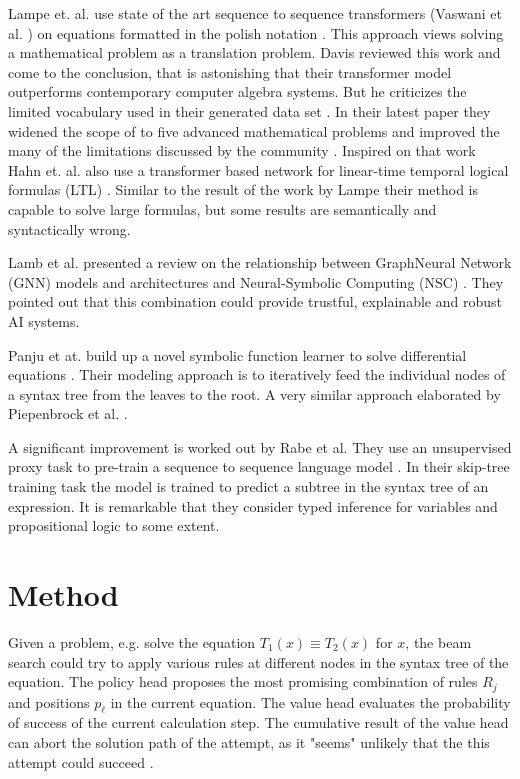 \documentclass{scrartcl}
\theoremstyle{definition}
\begin{document}
Lampe et. al. use state of the art sequence to sequence transformers (Vaswani et al. \cite{vaswani2017attention}) on equations formatted in the polish notation  \cite{Lample2020Deep}.
This approach views solving a mathematical problem as a translation problem.
Davis reviewed this work and come to the conclusion, that is astonishing that their transformer model outperforms contemporary computer algebra systems.
But he criticizes the limited vocabulary used in their generated data set \cite{davis2019use}.
In their latest paper they widened the scope of to five advanced mathematical problems and improved the many of the limitations discussed by the community \cite{charton2021learning}.
Inspired on that work Hahn et. al. also use a transformer based network for linear-time temporal logical formulas (LTL) \cite{hahn2021teaching}.
Similar to the result of the work by Lampe their method is capable to solve large formulas, but some results are semantically and syntactically wrong.

Lamb et al. presented a review on the relationship between GraphNeural Network (GNN) models and architectures and Neural-Symbolic Computing (NSC) \cite{lamb2020graph}.
They pointed out that this combination could provide trustful, explainable and robust AI systems.

Panju et at. build up a novel symbolic function learner to solve differential equations \cite{panju2020neurosymbolic}.
Their modeling approach is to iteratively feed the individual nodes of a syntax tree from the leaves to the root.
A very similar approach elaborated by Piepenbrock et al. \cite{piepenbrock2021learning}. 

A significant improvement is worked out by Rabe et al. They use an unsupervised proxy task to pre-train a sequence to sequence language model \cite{rabe2020mathematical}.
In their skip-tree training task the model is trained to predict a subtree in the syntax tree of an expression.
It is remarkable that they consider typed inference for variables and propositional logic to some extent.


\section{Method}

Given a problem, e.g. solve the equation $T_1\left(x\right)\equiv T_2\left(x\right)$ for $x$,
the beam search could try to apply various rules at different nodes in the syntax tree of the equation.
The policy head proposes the most promising combination of rules $R_j$ and positions $p_\ell$ in the current equation.
The value head evaluates the probability of success of the current calculation step.
The cumulative result of the value head can abort the solution path of the attempt, as it "seems" unlikely that the this attempt could succeed \cite{44806}.
\end{document}
